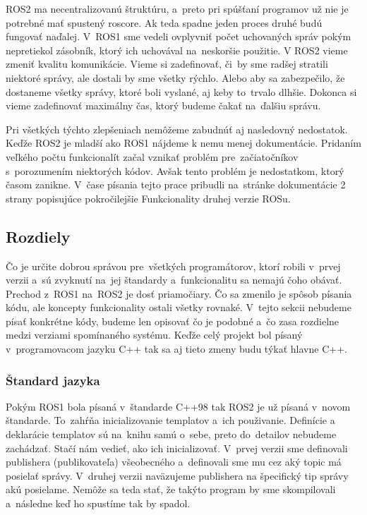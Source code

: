 ROS2 ma necentralizovanú štruktúru, a~preto pri spúšťaní programov už nie je potrebné mať spustený roscore. Ak teda spadne
jeden proces druhé budú fungovať naďalej. V~ROS1 sme vedeli ovplyvniť počet uchovaných správ pokým nepretiekol zásobník, ktorý ich uchovával na~neskoršie použitie.
V ROS2 vieme zmeniť kvalitu komunikácie. Vieme si zadefinovať, či~by sme radšej stratili niektoré správy, ale dostali by sme všetky rýchlo. Alebo aby sa zabezpečilo,
že dostaneme všetky správy, ktoré boli vyslané, aj keby to~trvalo dlhšie. Dokonca si vieme zadefinovať maximálny čas, ktorý budeme čakať na~ďalšiu správu.

Pri všetkých týchto zlepšeniach nemôžeme zabudnúť aj nasledovný nedostatok. Keďže ROS2 je mladší ako ROS1 nájdeme k nemu menej dokumentácie.
Pridaním veľkého počtu funkcionalít začal vznikať problém pre~začiatočníkov s~porozumením niektorých kódov. Avšak tento problém je nedostatkom,
ktorý časom zanikne. V~čase písania tejto prace pribudli na~stránke dokumentácie 2 strany popisujúce pokročilejšie Funkcionality druhej verzie ROSu.

\subsection{Rozdiely}

Čo je určite dobrou správou pre~všetkých programátorov, ktorí robili v~prvej verzii a~sú zvyknutí na~jej štandardy a~funkcionalitu sa nemajú čoho obávať.
Prechod z~ROS1 na~ROS2 je dosť priamočiary. Čo sa zmenilo je spôsob písania kódu, ale koncepty funkcionality ostali všetky rovnaké. V~tejto sekcii nebudeme
písať konkrétne kódy, budeme len opisovať čo je podobné a~čo zasa rozdielne medzi verziami spomínaného systému. Keďže celý projekt bol písaný v~programovacom
jazyku C++ tak sa aj tieto zmeny budu týkať hlavne C++.

\subsubsection{Štandard jazyka}

	Pokým ROS1 bola písaná v~štandarde C++98 tak ROS2 je už písaná v~novom štandarde. To~zahŕňa inicializovanie templatov a~ich použivanie. Definície
	a deklarácie templatov sú na~knihu samú o~sebe, preto do~detailov nebudeme zachádzať. Stačí nám vedieť, ako ich inicializovať. V~prvej verzii
	sme definovali publishera (publikovateľa) všeobecného a~definovali sme mu cez aký topic má posielať správy. V~druhej verzii naväzujeme publishera
	na špecifický tip správy akú posielame. Nemôže sa teda stať, že takýto program by sme skompilovali a~následne keď ho spustíme tak by spadol.

